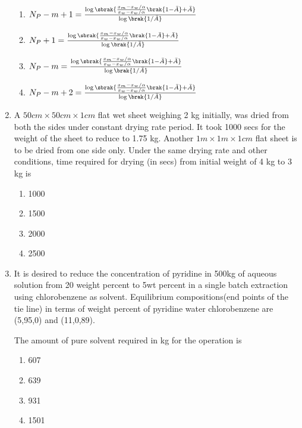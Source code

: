 \documentclass[journal,12pt,onecolumn]{IEEEtran}
\theoremstyle{remark}
\begin{document}
\begin{enumerate}
\begin{enumerate}
    \item $  N_P-m+1=\frac{\log\sbrak{\frac{x_m-x_w/\alpha}{x_w-x_w/\alpha}\brak{1-\Bar{A}}+\Bar{A}}}{\log \brak{1/\Bar{A}}}$
    \item $  N_P+1=\frac{\log\sbrak{\frac{x_m-x_w/\alpha}{x_w-x_w/\alpha}\brak{1-\Bar{A}}+\Bar{A}}}{\log \brak{1/\Bar{A}}}$
     \item $  N_P-m=\frac{\log\sbrak{\frac{x_m-x_w/\alpha}{x_w-x_w/\alpha}\brak{1-\Bar{A}}+\Bar{A}}}{\log \brak{1/\Bar{A}}}$
      \item $  N_P-m+2=\frac{\log\sbrak{\frac{x_m-x_w/\alpha}{x_w-x_w/\alpha}\brak{1-\Bar{A}}+\Bar{A}}}{\log \brak{1/\Bar{A}}}$
\end{enumerate}
   
    \item A $50cm \times 50 cm \times 1 cm$ flat wet sheet weighing 2 kg initially, was dried from both the sides under constant drying rate period. It took 1000 secs for the weight of the sheet to reduce to 1.75 kg. Another $1m\times 1m\times 1cm$ flat sheet is to be dried from one side only. Under the same drying rate and other conditions, time required for drying (in secs) from initial weight of 4 kg to 3 kg is 

    \begin{multicols}{4}
        \begin{enumerate}
    \item 1000
    \item 1500
    \item 2000
    \item 2500
\end{enumerate}
    \end{multicols}

    \item It is desired to reduce the concentration of pyridine in 500kg of aqueous solution from 20 weight percent to 5wt percent in a single batch extraction using chlorobenzene as solvent. Equilibrium compositions(end points of the tie line) in terms of weight percent of pyridine water chlorobenzene are (5,95,0) and (11,0,89).

    The amount of pure solvent required in kg for the operation is

    \begin{multicols}{4}
        \begin{enumerate}
            \item 607
            \item 639
            \item 931
            \item 1501
        \end{enumerate}
    \end{multicols}


\end{enumerate}
\end{document}
